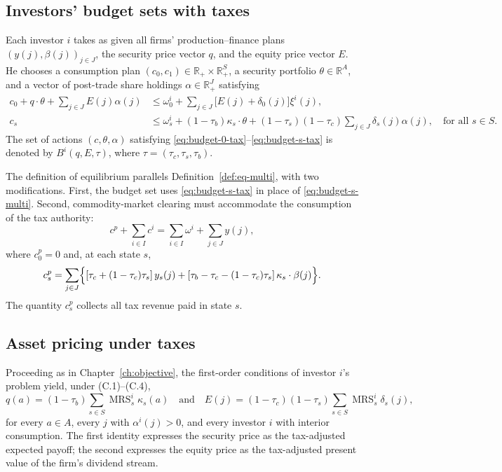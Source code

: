 \documentclass[11pt,a4paper,oneside]{book}
\def\R{\mathbb{R}}
\def\leq{\leqslant}
\def\et{\quad \text{and} \quad}
\DeclareMathOperator{\MRS}{MRS}
\theoremstyle{plain}
\theoremstyle{definition}
\theoremstyle{remark}
\numberwithin{equation}{chapter}
\begin{document}
\subsection{Investors' budget sets with taxes}

Each investor $i$ takes as given all firms' production--finance plans $(y(j), \beta(j))_{j \in J}$, the security price vector $q$, and the equity price vector $E$.
He chooses a consumption plan $(c_0, c_1) \in \R_+ \times \R_+^S$, a security portfolio $\theta \in \R^A$, and a vector of post-trade share holdings $\alpha \in \R_+^J$ satisfying
\begin{align}
  c_0 + q \cdot \theta + \sum_{j \in J} E(j) \alpha(j)
  &\leq
  \omega^i_0 + \sum_{j \in J} \bigl[ E(j) + \delta_0(j) \bigr] \xi^i(j),
  \label{eq:budget-0-tax}\\[2pt]
  c_s
  &\leq
  \omega^i_s + (1 - \tau_b) \kappa_s \cdot \theta + (1-\tau_s)(1-\tau_c) \sum_{j \in J} \delta_s(j) \alpha(j),
  \quad \text{for all $s\in S$}.
  \label{eq:budget-s-tax}
\end{align}
The set of actions $(c, \theta, \alpha)$ satisfying \eqref{eq:budget-0-tax}--\eqref{eq:budget-s-tax} is denoted by $B^i(q, E, \tau)$, where $\tau = (\tau_c, \tau_s, \tau_b)$.

The definition of equilibrium parallels Definition~\ref{def:eq-multi}, with two modifications.
First, the budget set uses \eqref{eq:budget-s-tax} in place of \eqref{eq:budget-s-multi}.
Second, commodity-market clearing must accommodate the consumption of the tax authority:
\begin{equation*}
  c^p + \sum_{i \in I} c^i = \sum_{i \in I} \omega^i + \sum_{j \in J} y(j),
\end{equation*}
where $c^p_0 = 0$ and, at each state $s$,
\begin{equation*}
  c^p_s = \sum_{j \in J} \Bigl\{ [\tau_c + (1-\tau_c)\tau_s] \, y_s(j) + [\tau_b - \tau_c - (1-\tau_c)\tau_s] \, \kappa_s \cdot \beta(j) \Bigr\}.
\end{equation*}
The quantity $c^p_s$ collects all tax revenue paid in state $s$.

\subsection{Asset pricing under taxes}

Proceeding as in Chapter~\ref{ch:objective}, the first-order conditions of investor $i$'s problem yield, under \textup{(C.1)--(C.4)},
\begin{equation}\label{eq:price-tax}
  q(a) = (1-\tau_b) \sum_{s \in S} \MRS^i_s \kappa_s(a)
  \et
  E(j) = (1-\tau_c)(1-\tau_s) \sum_{s \in S} \MRS^i_s \delta_s(j),
\end{equation}
for every $a \in A$, every $j$ with $\alpha^i(j) > 0$, and every investor $i$ with interior consumption.
The first identity expresses the security price as the tax-adjusted expected payoff; the second expresses the equity price as the tax-adjusted present value of the firm's dividend stream.
\end{document}
